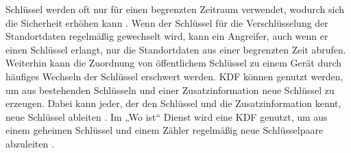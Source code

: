 Schlüssel werden oft nur für einen begrenzten Zeitraum verwendet, wodurch sich die Sicherheit erhöhen kann \cite[S. 378f.]{Krypto}.
Wenn der Schlüssel für die Verschlüsselung der Standortdaten regelmäßig gewechselt wird, kann ein Angreifer, auch wenn er einen Schlüssel erlangt, nur die Standortdaten aus einer begrenzten Zeit abrufen.
Weiterhin kann die Zuordnung von öffentlichem Schlüssel zu einem Gerät durch häufiges Wechseln der Schlüssel erschwert werden.
\ac{KDF} können genutzt werden, um aus bestehenden Schlüsseln und einer Zusatzinformation neue Schlüssel zu erzeugen.
Dabei kann jeder, der den Schlüssel und die Zusatzinformation kennt, neue Schlüssel ableiten \cite[S. 378ff.]{Krypto}.
Im „Wo ist“ Dienst wird eine \ac{KDF} genutzt, um aus einem geheimen Schlüssel und einem Zähler regelmäßig neue Schlüsselpaare abzuleiten \cite{Heinrich_FindMy}.
